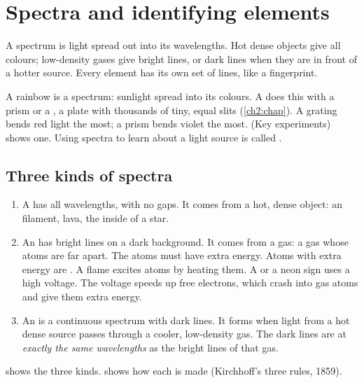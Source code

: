 \section{Spectra and identifying elements}\label{ch1:sec:spectra}

\begin{bigidea}
A spectrum is light spread out into its wavelengths. Hot dense objects give all colours;
low-density gases give bright lines, or dark lines when they are in front of a hotter source.
Every element has its own set of lines, like a fingerprint.
\end{bigidea}

\begin{keywords}
\end{keywords}

A rainbow is a spectrum: sunlight spread into its colours. A  does this with
a prism or a , a plate with thousands of tiny, equal slits
(\cref{ch2:chap}). A grating bends red light the most; a prism bends violet the most.
 (Key experiments) shows one. Using spectra to learn about a light
source is called .

\subsection{Three kinds of spectra}

\begin{enumerate}
  \item A  has all wavelengths, with no gaps. It comes from a hot,
        dense object: an  filament, lava, the inside of a star.
  \item An  has bright lines on a dark background. It comes from a
         gas: a gas whose atoms are far apart. The atoms must have extra
        energy. Atoms with extra energy are . A flame excites atoms by heating
        them. A  or a neon sign uses a high voltage. The voltage speeds up
        free electrons, which crash into gas atoms and give them extra energy.
  \item An  is a continuous spectrum with dark lines. It forms when
        light from a hot dense source passes through a cooler, low-density gas. The dark lines
        are at \emph{exactly the same wavelengths} as the bright lines of that gas.
\end{enumerate}
 shows the three kinds.  shows how each is made
(Kirchhoff's three rules, 1859).

